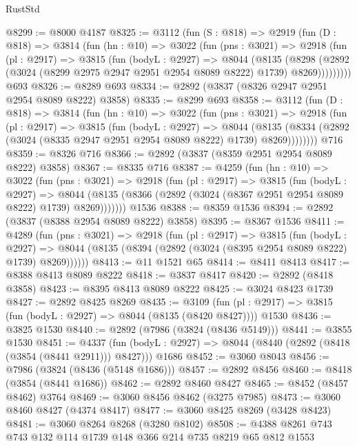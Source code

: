 \begin{lexlean}{RustStd}
\begin{coremodule}
@8299 := @8000 @4187
@8325 := @3112
    (fun (S : @818) =>
    @2919
      (fun (D : @818) =>
      @3814
        (fun (hn : @10) =>
        @3022
          (fun (pns : @3021) =>
          @2918
            (fun (pl : @2917) =>
            @3815
              (fun (bodyL : @2927) =>
              @8044
                (@8135
                  (@8298
                    (@2892 (@3024 (@8299 @2975 @2947 @2951 @2954 @8089 @8222) @1739) @8269)))))))))
    @693
@8326 := @8289 @693
@8334 := @2892 (@3837 (@8326 @2947 @2951 @2954 @8089 @8222) @3858)
@8335 := @8299 @693
@8358 := @3112
    (fun (D : @818) =>
    @3814
      (fun (hn : @10) =>
      @3022
        (fun (pns : @3021) =>
        @2918
          (fun (pl : @2917) =>
          @3815
            (fun (bodyL : @2927) =>
            @8044
              (@8135 (@8334 (@2892 (@3024 (@8335 @2947 @2951 @2954 @8089 @8222) @1739) @8269))))))))
    @716
@8359 := @8326 @716
@8366 := @2892 (@3837 (@8359 @2951 @2954 @8089 @8222) @3858)
@8367 := @8335 @716
@8387 := @4259
    (fun (hn : @10) =>
    @3022
      (fun (pns : @3021) =>
      @2918
        (fun (pl : @2917) =>
        @3815
          (fun (bodyL : @2927) =>
          @8044 (@8135 (@8366 (@2892 (@3024 (@8367 @2951 @2954 @8089 @8222) @1739) @8269)))))))
    @1536
@8388 := @8359 @1536
@8394 := @2892 (@3837 (@8388 @2954 @8089 @8222) @3858)
@8395 := @8367 @1536
@8411 := @4289
    (fun (pns : @3021) =>
    @2918
      (fun (pl : @2917) =>
      @3815
        (fun (bodyL : @2927) =>
        @8044 (@8135 (@8394 (@2892 (@3024 (@8395 @2954 @8089 @8222) @1739) @8269))))))
@8413 := @11 @1521 @65
@8414 := @8411 @8413
@8417 := @8388 @8413 @8089 @8222
@8418 := @3837 @8417
@8420 := @2892 (@8418 @3858)
@8423 := @8395 @8413 @8089 @8222
@8425 := @3024 @8423 @1739
@8427 := @2892 @8425 @8269
@8435 := @3109
    (fun (pl : @2917) => @3815 (fun (bodyL : @2927) => @8044 (@8135 (@8420 @8427))))
    @1530
@8436 := @3825 @1530
@8440 := @2892 (@7986 (@3824 (@8436 @5149)))
@8441 := @3855 @1530
@8451 := @4337
    (fun (bodyL : @2927) => @8044 (@8440 (@2892 (@8418 (@3854 (@8441 @2911))) @8427)))
    @1686
@8452 := @3060 @8043
@8456 := @7986 (@3824 (@8436 (@5148 @1686)))
@8457 := @2892 @8456
@8460 := @8418 (@3854 (@8441 @1686))
@8462 := @2892 @8460 @8427
@8465 := @8452 (@8457 @8462) @3764
@8469 := @3060 @8456 @8462 (@3275 @7985)
@8473 := @3060 @8460 @8427 (@4374 @8417)
@8477 := @3060 @8425 @8269 (@3428 @8423)
@8481 := @3060 @8264 @8268 (@3280 @8102)
@8508 := @4388
    @8261
    @743
    @743
    @132
    @114
    @1739
    @148
    @366
    @214
    @735
    @8219
    @65
    @812
    @1553

\end{coremodule}
\end{lexlean}
